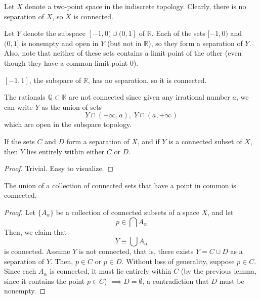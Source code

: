     \begin{example}
    Let $X$ denote a two-point space in the indiscrete topology. Clearly, there is no separation of $X$, so $X$ is connected. 
    \end{example}

    \begin{example}
    Let $Y$ denote the subspace $[-1,0) \cup (0,1]$ of $\mathbb{R}$. Each of the sets $[-1,0)$ and $(0,1]$ is nonempty and open in $Y$ (but not in $\mathbb{R}$), so they form a separation of $Y$. Also, note that neither of these sets contains a limit point of the other (even though they have a common limit point $0$). 
    \end{example}

    \begin{example}
    $[-1,1]$, the subspace of $\mathbb{R}$, has no separation, so it is connected. 
    \end{example}

    \begin{example}
    The rationals $\mathbb{Q} \subset \mathbb{R}$ are not connected since given any irrational number $a$, we can write $Y$ as the union of sets
    \[Y \cap (-\infty, a), \; Y \cap (a, +\infty)\]
    which are open in the subspace topology. 
    \end{example}

    \begin{lemma}
    If the sets $C$ and $D$ form a separation of $X$, and if $Y$ is a connected subset of $X$, then $Y$ lies entirely within either $C$ or $D$. 
    \end{lemma}
    \begin{proof}
    Trivial. Easy to visualize. 
    \end{proof}

    \begin{theorem}
    The union of a collection of connected sets that have a point in common is connected. 
    \end{theorem}
    \begin{center}
    \end{center}

    \begin{proof}
    Let $\{A_\alpha\}$ be a collection of connected subsets of a space $X$, and let 
    \[p \in \bigcap A_\alpha\]
    Then, we claim that 
    \[Y \equiv \bigcup A_\alpha\]
    is connected. Assume $Y$ is not connected, that is, there exists $Y = C \cup D$ as a separation of $Y$. Then, $p \in C$ or $p \in D$. Without loss of generality, suppose $p \in C$. Since each $A_\alpha$ is connected, it must lie entirely within $C$ (by the previous lemma, since it contains the point $p \in C$) $\implies D = \emptyset$, a contradiction that $D$ must be nonempty. 
    \end{proof}

